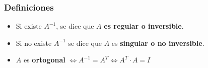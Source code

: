 \subsubsection*{Definiciones}
\begin{itemize}
    \item Si existe \(A^{-1}\), se dice que \(A\) \textbf{es regular o inversible}.
    \item Si no existe \(A^{-1}\) se dice que \(A\) es \textbf{singular o no inversible}. 
    \item \(A\) es \textbf{ortogonal} \(\iff A^{-1} = A^T \iff A^T \cdot A = I\)  
\end{itemize}





 

